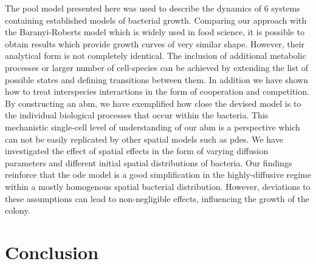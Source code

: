 \documentclass[10pt,twocolumn,5p]{elsarticle}
\numberwithin{equation}{section}
\begin{document}
The pool model presented here was used to describe the dynamics of 6 systems containing established models of bacterial growth.
Comparing our approach with the Baranyi-Roberts model which is widely used in food science, it is possible to obtain results which provide growth curves of very similar shape.
However, their analytical form is not completely identical.
The inclusion of additional metabolic processes or larger number of cell-species can be achieved by extending the list of possible states and defining transitions between them.
In addition we have shown how to treat interspecies interactions in the form of cooperation and competition.
By constructing an \ac{abm}, we have exemplified how close the devised model is to the individual biological processes that occur within the bacteria.
This mechanistic single-cell level of understanding of our \ac{abm} is a perspective which can not be easily replicated by other spatial models such as \acp{pde}.
We have investigated the effect of spatial effects in the form of varying diffusion parameters and different initial spatial distributions of bacteria.
Our findings reinforce that the \ac{ode} model is a good simplification in the highly-diffusive regime within a mostly homogenous spatial bacterial distribution.
However, deviations to these assumptions can lead to non-negligible effects, influencing the growth of the colony.

\section{Conclusion}
\end{document}
